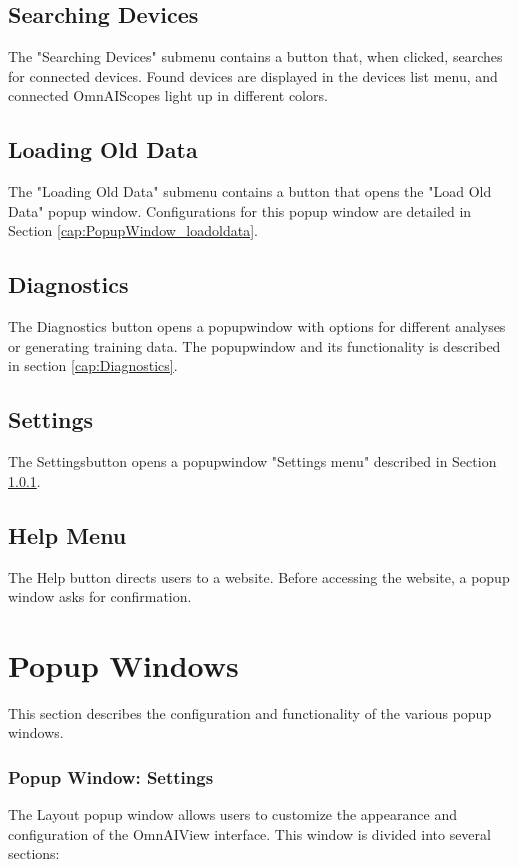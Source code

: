 \documentclass[]{scrreprt}
\begin{document}
\subsection{Searching Devices}
The "Searching Devices" submenu contains a button that, when clicked, searches for connected devices. Found devices are displayed in the devices list menu, and connected OmnAIScopes light up in
different colors.

\subsection{Loading Old Data}
The "Loading Old Data" submenu contains a button that opens the "Load Old Data" popup window. Configurations for this popup window are detailed in Section \ref{cap:PopupWindow_loadoldata}.

\subsection{Diagnostics}
The Diagnostics button opens a popupwindow with options for different analyses or generating training data. The popupwindow and its functionality is described in section \ref{cap:Diagnostics}.

\subsection{Settings}
The Settingsbutton opens a popupwindow "Settings menu" described in Section \ref{cap:PopupWindow_settings}.

\subsection{Help Menu}
The Help button directs users to a website. Before accessing the website, a popup window asks for confirmation.

\section{Popup Windows}

This section describes the configuration and functionality of the various popup windows.

\subsubsection{Popup Window: Settings} \label{cap:PopupWindow_settings}

The Layout popup window allows users to customize the appearance and configuration of the OmnAIView interface. This window is divided into several sections:
\end{document}
